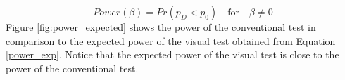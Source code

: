 \documentclass{article}
\newtheorem{thm}{Theorem}[section]
\begin{document}
\begin{equation}\label{power_exp} 
   Power(\beta)=Pr(p_{D} < p_0)  \quad \text{for}  \quad \beta \ne 0
\end{equation}
Figure \ref{fig:power_expected} shows the power of the conventional test in comparison to the expected power of the visual test obtained from Equation \ref{power_exp}. Notice that the expected power of the visual test is %
close to the power of the conventional test. 


% 
%
%
%
%
%
\end{document}
